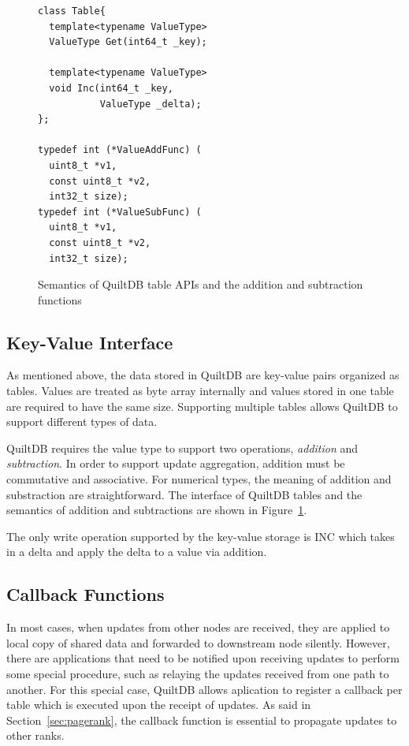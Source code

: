 \documentclass[11pt, twocolumn]{article}
\begin{document}
\begin{figure}[th!]

\begin{lstlisting}
class Table{
  template<typename ValueType>
  ValueType Get(int64_t _key);

  template<typename ValueType>
  void Inc(int64_t _key,
           ValueType _delta);
};

typedef int (*ValueAddFunc) (
  uint8_t *v1,
  const uint8_t *v2,
  int32_t size);
typedef int (*ValueSubFunc) (
  uint8_t *v1,
  const uint8_t *v2,
  int32_t size);
\end{lstlisting}
\caption{Semantics of QuiltDB table APIs and the addition and subtraction
  functions}
\label{fig:table-api}
\end{figure}

\subsection{Key-Value Interface}

As mentioned above, the data stored in QuiltDB are key-value pairs organized
as tables. Values are treated as byte array internally and values stored in one
table are required to have the same size. Supporting multiple tables allows
QuiltDB to support different types of data.

QuiltDB requires the value type to support two operations, \emph{addition} and
\emph{subtraction}. In order to support update aggregation, {addition} must
 be commutative and associative. For numerical types,  the meaning of
{addition} and {substraction} are straightforward. The interface of
QuiltDB tables and the semantics of addition and subtractions are shown in
Figure~\ref{fig:table-api}.

The only write operation supported by the key-value storage is INC which takes
in a delta and apply the delta to a value via {addition}.

\subsection{Callback Functions}
\label{sec:callback}

In most cases, when updates from other nodes are received, they are applied to
local copy of shared data and forwarded to downstream node silently.
However, there are applications that need to be notified upon receiving updates
to perform some special procedure, such as relaying the updates received from
one path to another. For this special case, QuiltDB allows aplication to
register a callback per table which is executed upon the receipt of updates. As
said in Section~\ref{sec:pagerank}, the callback function is essential to
propagate updates to other ranks.
\end{document}

